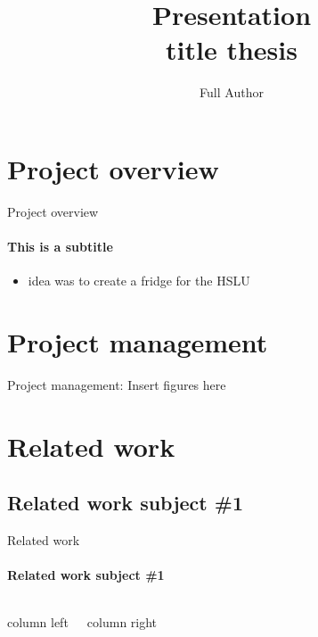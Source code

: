 \documentclass[aspectratio=169, professionalfonts]{beamer}
\title[Title thesis]{Presentation\\ title thesis}
\author[S. Author]{Full Author}
\begin{document}
\typesetFrontSlides


\section{Project overview}


\begin{frame}{Project overview}
	\framesubtitle{This is a subtitle}
	\begin{itemize}
		\item idea was to create a fridge for the HSLU
	\end{itemize}
	
\end{frame}

\section{Project management}


\begin{frame}{Project management:}
    Insert figures here
    
\end{frame}

\section{Related work}

\subsection{Related work subject \#1}

\begin{frame}{Related work}
    \framesubtitle{Related work subject \#1}
    \begin{columns}[T]

            column left
        
            column right
    \end{columns}
    
	
\end{frame}
\end{document}
